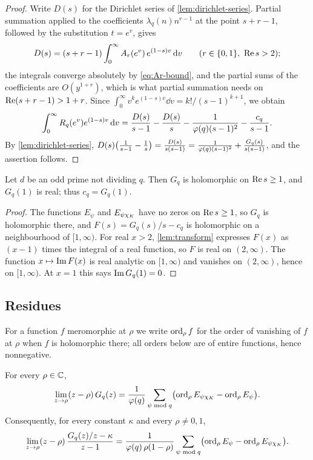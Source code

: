 \begin{proof}
Write $D(s)$ for the Dirichlet series of \cref{lem:dirichlet-series}. Partial summation applied
to the coefficients $\lambda_q(n)n^{r-1}$ at the point $s+r-1$, followed by the substitution
$t=e^v$, gives
\[
  D(s)=(s+r-1)\int_0^\infty A_r(e^v)\,e^{(1-s)v}\mathop{}\!\mathrm{d} v\qquad(r\in\{0,1\},\ \operatorname{Re} s>2);
\]
the integrals converge absolutely by \eqref{eq:Ar-bound}, and the partial sums of the coefficients
are $O(y^{1+r})$, which is what partial summation needs on $\operatorname{Re}(s+r-1)>1+r$. Since
$\int_0^\infty v^k e^{(1-s)v}\dd v=k!/(s-1)^{k+1}$, we obtain
\[
  \int_0^\infty R_q(e^v)e^{(1-s)v}\mathop{}\!\mathrm{d} v
  =\frac{D(s)}{s-1}-\frac{D(s)}{s}-\frac{1}{\varphi(q)(s-1)^2}-\frac{c_q}{s-1}.
\]
By \cref{lem:dirichlet-series}, $D(s)\bigl(\frac1{s-1}-\frac1s\bigr)=\frac{D(s)}{s(s-1)}
=\frac{1}{\varphi(q)(s-1)^2}+\frac{G_q(s)}{s(s-1)}$, and the assertion follows.
\end{proof}

\begin{lemma}\label{lem:G-real}
Let $d$ be an odd prime not dividing $q$. Then $G_q$ is holomorphic on $\operatorname{Re} s\ge1$, and $G_q(1)$
is real; thus $c_q=G_q(1)$.
\end{lemma}

\begin{proof}
The functions $E_\psi$ and $E_{\psi\chi_K}$ have no zeros on $\operatorname{Re} s\ge1$, so $G_q$ is holomorphic
there, and $F(s)=G_q(s)/s-c_q$ is holomorphic on a neighbourhood of $[1,\infty)$. For real $x>2$,
\cref{lem:transform} expresses $F(x)$ as $(x-1)$ times the integral of a real function, so $F$ is
real on $(2,\infty)$. The function $x\mapsto\operatorname{Im} F(x)$ is real analytic on $[1,\infty)$ and vanishes
on $(2,\infty)$, hence on $[1,\infty)$. At $x=1$ this says $\operatorname{Im} G_q(1)=0$.
\end{proof}

\subsection{Residues}\label{ss:residues}
For a function $f$ meromorphic at $\rho$ we write $\operatorname{ord}_\rho f$ for the order of vanishing of $f$
at $\rho$ when $f$ is holomorphic there; all orders below are of entire functions, hence
nonnegative.

\begin{lemma}\label{lem:residue-G}
For every $\rho\in\mathbb{C}$,
\[
  \lim_{z\to\rho}(z-\rho)\,G_q(z)=\frac{1}{\varphi(q)}\sum_{\psi\bmod q}
  \bigl(\operatorname{ord}_\rho E_{\psi\chi_K}-\operatorname{ord}_\rho E_\psi\bigr).
\]
Consequently, for every constant $\kappa$ and every $\rho\neq0,1$,
\[
  \lim_{z\to\rho}(z-\rho)\,\frac{G_q(z)/z-\kappa}{z-1}
  =\frac{1}{\varphi(q)\,\rho(1-\rho)}\sum_{\psi\bmod q}
  \bigl(\operatorname{ord}_\rho E_{\psi}-\operatorname{ord}_\rho E_{\psi\chi_K}\bigr).
\]
\end{lemma}

